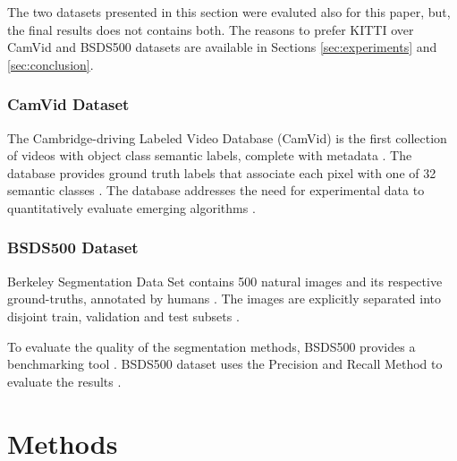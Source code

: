 \documentclass[10pt,twocolumn,letterpaper]{article}
\begin{document}
The two datasets presented in this section were evaluted also for this paper, but, the final results does not contains both. The reasons to prefer KITTI over CamVid and BSDS500 datasets are available in Sections \ref{sec:experiments} and \ref{sec:conclusion}.

\subsubsection{CamVid Dataset} \label{sssec:camvid_datasets}

The Cambridge-driving Labeled Video Database (CamVid) is the first collection of videos with object class semantic labels, complete with metadata \cite{CAMVID}. The database provides ground truth labels that associate each pixel with one of 32 semantic classes \cite{CAMVID}. The database addresses the need for experimental data to quantitatively evaluate emerging algorithms \cite{CAMVID}.

\subsubsection{BSDS500 Dataset} \label{sssec:bsds_dataset}

Berkeley Segmentation Data Set contains 500 natural images and its respective ground-truths, annotated by humans \cite{BSDS500}. The images are explicitly separated into disjoint train, validation and test subsets \cite{BSDS500}.

To evaluate the quality of the segmentation methods, BSDS500 provides a benchmarking tool \cite{BSDS500}. BSDS500 dataset uses the Precision and Recall Method to evaluate the results \cite{BSDS500}.


\section{Methods} \label{sec:methods}

\end{document}
